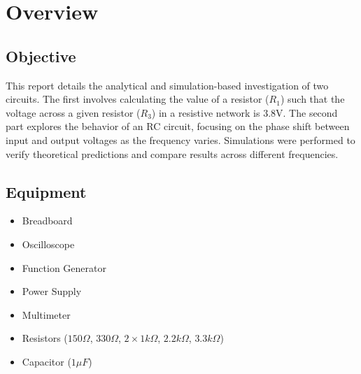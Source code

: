 \chapter{Overview}

\section{Objective}
This report details the analytical and simulation-based investigation of two circuits. The first involves calculating the value of a resistor ($R_1$) such that the voltage across a given resistor ($R_3$) in a resistive network is 3.8V. The second part explores the behavior of an RC circuit, focusing on the phase shift between input and output voltages as the frequency varies. Simulations were performed to verify theoretical predictions and compare results across different frequencies.


\section{Equipment}
\begin{itemize}
    \item Breadboard
    \item Oscilloscope
    \item Function Generator
    \item Power Supply
    \item Multimeter
    \item Resistors ($150\Omega$, $330\Omega$, $2\times 1k\Omega$, $2.2k\Omega$, $3.3k\Omega$)
    \item Capacitor ($1\mu F$)
\end{itemize}
